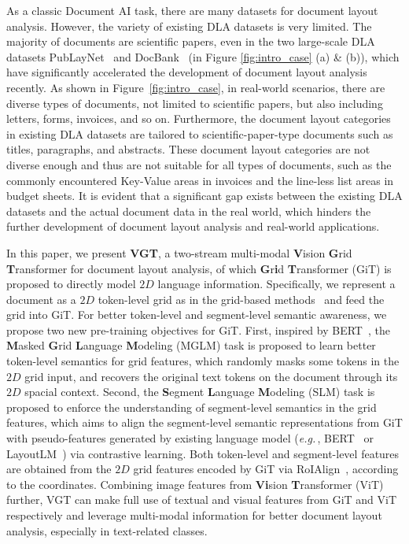\documentclass[10pt,twocolumn,letterpaper]{article}
\def\eg{\emph{e.g.}\,}
\begin{document}
As a classic Document AI task, there are many datasets for document layout analysis.
However, the variety of existing DLA datasets is very limited.
The majority of documents are scientific papers, even in the two large-scale DLA datasets PubLayNet~\cite{zhong2019publaynet} and DocBank~\cite{li2020docbank} (in Figure \ref{fig:intro_case} (a) \& (b)), which have significantly accelerated the development of document layout analysis recently.
As shown in Figure~\ref{fig:intro_case}, in real-world scenarios, there are diverse types of documents, not limited to scientific papers, but also including letters, forms, invoices, and so on.
Furthermore, the document layout categories in existing DLA datasets are tailored to scientific-paper-type documents such as titles, paragraphs, and abstracts.
These document layout categories are not diverse enough and thus are not suitable for all types of documents, such as the commonly encountered Key-Value areas in invoices and the line-less list areas in budget sheets.
It is evident that a significant gap exists between the existing DLA datasets and the actual document data in the real world, which hinders the further development of document layout analysis and real-world applications.

In this paper, we present \textbf{VGT}, a two-stream multi-modal \textbf{V}ision \textbf{G}rid \textbf{T}ransformer for document layout analysis,
of which \textbf{G}r\textbf{i}d \textbf{T}ransformer (GiT) is proposed to directly model $2D$ language information.
Specifically, we represent a document as a  $2D$ token-level grid as in the grid-based methods~\cite{yang2017learning,kaplan2021combining,zhang2021vsr} 
and feed the grid into GiT.
For better token-level and segment-level semantic awareness,
we propose two new pre-training objectives for GiT. 
First, inspired by BERT~\cite{devlin2018bert}, the \textbf{M}asked \textbf{G}rid \textbf{L}anguage \textbf{M}odeling (MGLM) task is proposed to learn better token-level semantics for grid features,
which randomly masks some tokens in the $2D$ grid input, and recovers the original text tokens on the document through its $2D$ spacial context.
Second, the \textbf{S}egment \textbf{L}anguage \textbf{M}odeling (SLM) task is proposed to enforce the understanding of segment-level semantics in the grid features,
which aims to align the segment-level semantic representations from GiT with pseudo-features generated by existing language model (\eg, BERT~\cite{bao2021beit} or LayoutLM~\cite{xu2020layoutlm}) via contrastive learning.
Both token-level and segment-level features are obtained from the $2D$ grid features encoded by GiT via RoIAlign~\cite{he2017mask}, according to the coordinates.
Combining image features from \textbf{Vi}sion \textbf{T}ransformer (ViT) further,
VGT can make full use of textual and visual features from GiT and ViT respectively 
and leverage multi-modal information for better document layout analysis, especially in text-related classes.
\end{document}
